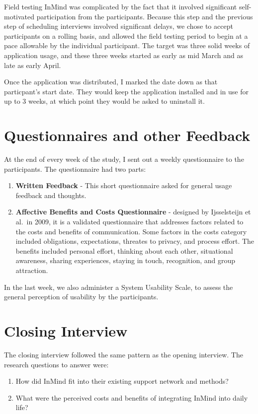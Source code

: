   Field testing InMind was complicated by the fact that it involved
  significant self-motivated participation from the participants.
  Because this step and the previous step of scheduling interviews
  involved significant delays,
  we chose to accept participants on a rolling basis,
  and allowed the field testing period to begin at a pace allowable
  by the individual participant.
  The target was three solid weeks of application usage,
  and these three weeks started as early as mid March
  and as late as early April.

  Once the application was distributed,
  I marked the date down as that particpant's start date.
  They would keep the application installed and in use for up to 3 weeks,
  at which point they would be asked to uninstall it.

\section{Questionnaires and other Feedback}
  At the end of every week of the study,
  I sent out a weekly questionnaire to the participants.
  The questionnaire had two parts:
  \begin{enumerate}
  \item \textbf{Written Feedback} -
  This short questionnaire asked for
  general usage feedback and thoughts.

  \item \textbf{Affective Benefits and Costs Questionnaire} -
  designed by Ijsselsteijn et al.\ in 2009,
  it is a validated questionnaire that
  addresses factors related to the costs and benefits of communication.
  Some factors in the costs category included obligations,
  expectations, threates to privacy, and process effort.
  The benefits included personal effort,
  thinking about each other,
  situational awareness,
  sharing experiences,
  staying in touch,
  recognition,
  and group attraction.
  \end{enumerate}

	In the last week, we also administer a System Usability Scale,
	to assess the general perception of usability by the participants.

\section{Closing Interview}
  The closing interview followed the same pattern as the opening interview.
  The research questions to answer were:
  \begin{enumerate}
  \item How did InMind fit into their existing support network and methods?
  \item What were the perceived costs and benefits of integrating InMind
  into daily life?
  \end{enumerate}


